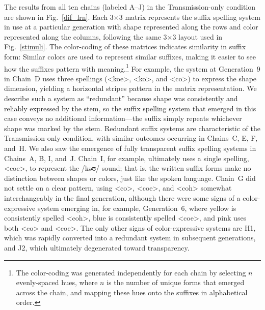 \documentclass[doc,biblatex]{apa7}
\begin{document}
The results from all ten chains (labeled A--J) in the Transmission-only condition are shown in Fig.~\ref{dif_lrn}. Each 3×3 matrix represents the suffix spelling system in use at a particular generation with shape represented along the rows and color represented along the columns, following the same 3×3 layout used in Fig.~\ref{stimuli}. The color-coding of these matrices indicates similarity in suffix form: Similar colors are used to represent similar suffixes, making it easier to see how the suffixes pattern with meaning.\footnote{The color-coding was generated independently for each chain by selecting $n$ evenly-spaced hues, where $n$ is the number of unique forms that emerged across the chain, and mapping these hues onto the suffixes in alphabetical order.} For example, the system at Generation~9 in Chain~D uses three spellings (<koe>, <ko>, and <co>) to express the shape dimension, yielding a horizontal stripes pattern in the matrix representation. We describe such a system as ``redundant'' because shape was consistently and reliably expressed by the stem, so the suffix spelling system that emerged in this case conveys no additional information---the suffix simply repeats whichever shape was marked by the stem. Redundant suffix systems are characteristic of the Transmission-only condition, with similar outcomes occurring in Chains~C, E, F, and~H. We also saw the emergence of fully transparent suffix spelling systems in Chains~A, B, I, and~J. Chain~I, for example, ultimately uses a single spelling, <coe>, to represent the /kəʊ/ sound; that is, the written suffix forms make no distinction between shapes or colors, just like the spoken language. Chain~G did not settle on a clear pattern, using <co>, <coe>, and <coh> somewhat interchangeably in the final generation, although there were some signs of a color-expressive system emerging in, for example, Generation~6, where yellow is consistently spelled <coh>, blue is consistently spelled <coe>, and pink uses both <co> and <coe>. The only other signs of color-expressive systems are H1, which was rapidly converted into a redundant system in subsequent generations, and J2, which ultimately degenerated toward transparency.
\end{document}
